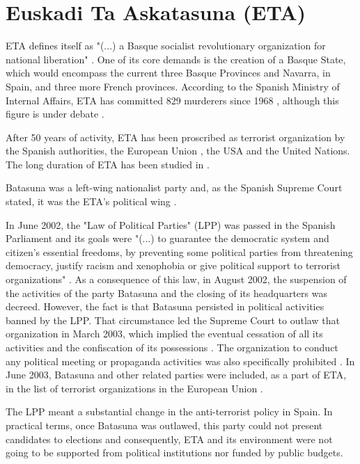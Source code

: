 
\chapter{Euskadi Ta Askatasuna (ETA)} \label{ETA}

ETA defines itself as "(...) a Basque socialist revolutionary organization for national liberation" \cite{ETA, ceaseFire, wETA}. One of its core demands is the creation of a Basque State, which would encompass the current three Basque Provinces and Navarra, in Spain, and three more French provinces. According to the Spanish Ministry of Internal Affairs, ETA has committed 829 murderers since 1968 \cite{MI}, although this figure is under debate \cite{Buesa}. 

After 50 years of activity, ETA has been proscribed as terrorist organization by the Spanish authorities, the European Union \cite{PC}, the USA and the United Nations. The long duration of ETA has been studied in \cite{Barros3}.

Batasuna was a left-wing nationalist party and, as the Spanish Supreme Court stated, it was the ETA's political wing \cite{sentencia}.

In June 2002, the "Law of Political Parties" (LPP) was passed in the Spanish Parliament and its goals were "(...) to guarantee the democratic system and citizen's essential freedoms, by preventing some political parties from threatening democracy, justify racism and xenophobia or give political support to terrorist organizations" \cite{LP}. As a consequence of this law, in August 2002, the suspension of the activities of the party Batasuna and the closing of its headquarters was decreed. However, the fact is that Batasuna persisted in political activities banned by the LPP. That circumstance led the Supreme Court to outlaw that organization in March 2003, which implied the eventual cessation of all its activities and the confiscation of its possessions \cite{sentencia}. The organization to conduct any political meeting or propaganda activities was also specifically prohibited \cite{auto}. In June 2003, Batasuna and other related parties were included, as a part of ETA, in the list of terrorist organizations in the European Union \cite{PC}.

The LPP meant a substantial change in the anti-terrorist policy in Spain. In practical terms, once Batasuna was outlawed, this party could not present candidates to elections and consequently, ETA and its environment were not going to be supported  from political institutions nor funded by public budgets. 

